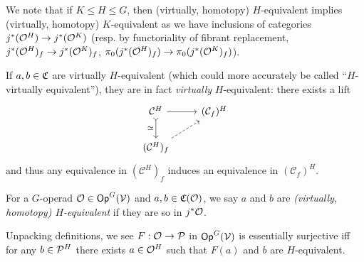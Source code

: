 \documentclass[a4paper,10pt
]{article}%
\renewcommand{\1}{\ensuremath{\mathbb{id}}}
\begin{document}
\begin{remark}
      \label{HK_EQUIV_REM}
      We note that if $K \leq H \leq G$, then (virtually, homotopy) $H$-equivalent implies (virtually, homotopy) $K$-equivalent
      as we have inclusions of categories
      $j^{\**}(\O^H) \to j^{\**}(\O^K)$
      (resp. by functoriality of fibrant replacement,
      $j^{\**}(\O^H)_f \to j^{\**}(\O^K)_f$,
      $\pi_0(j^{\**}(\O^H)_f) \to \pi_0(j^{\**}(\O^K)_f)$).
\end{remark}

\begin{remark}
      \label{HVIRT_REM}
      If $a,b\in \C$ are virtually $H$-equivalent (which could more accurately be called ``$H$-virtually equivalent''),
      they are in fact \textit{virtually} $H$-equivalent:
      there exists a lift
      \begin{equation}
            \label{FIBFIX_LIFT_EQ}
            \begin{tikzcd}
                  \mathcal C^H \arrow[d, tail, "\simeq"'] \arrow[r]
                  &
                  (\mathcal C_f)^H
                  \\
                  (\mathcal C^H)_f \arrow[ur, dashed]
            \end{tikzcd}
      \end{equation}
      and thus any equivalence in $(\mathcal C^H)_f$ induces an equivalence in $(\mathcal C_f)^H$. 
\end{remark}

\begin{definition}
      For a $G$-operad $\O\in \mathsf{Op}^G(\V)$ and $a,b\in \C(\O)$, we say $a$ and $b$ are
      {\em (virtually, homotopy) $H$-equivalent}
      if they are so in $j^*\O$. 
\end{definition}

\begin{remark}
      \label{ESS_SUR_REM}
      Unpacking definitions, we see
      $F: \O \to \P$ in $\Op^G(\V)$ is essentially surjective iff
      for any $b \in \P^H$ there exists $a \in \O^H$ such that $F(a)$ and $b$ are $H$-equivalent.
\end{remark}
\end{document}

